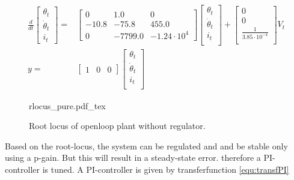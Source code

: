 \documentclass[../../../Main]{subfiles}
\begin{document}
\begin{equation}
      \label{eq:zero_linearized}
      \begin{split}
      \frac{d}{dt}
    \begin{bmatrix}
        \theta_t \\
        \dot \theta_t \\
        i_t
    \end{bmatrix}
    =&
    \begin{bmatrix}0 & 1.0 & 0\\ -10.8 & -75.8 & 455.0\\ 0 & -7799.0 & -1.24\cdot10^{4}\end{bmatrix}
    \begin{bmatrix}
        \theta_t \\
        \dot \theta_t \\
        i_t \\
    \end{bmatrix}
    +
    \begin{bmatrix}
        0 \\
        0 \\
	\frac{1}{3.85\cdot10^{-4}}\\
    \end{bmatrix}
    V_t
\\
      y =&
    \begin{bmatrix}
        1 & 0 & 0
    \end{bmatrix}
    \begin{bmatrix}
        \theta_t \\
        \dot \theta_t\\
        i_t\\
    \end{bmatrix}
    \end{split}
\end{equation}

\begin{figure}[H]
\centering
\def\svgwidth{\textwidth}
{rlocus_pure.pdf_tex}
\caption{Root locus of openloop plant without regulator.}
\label{fig:rlocus_pure}
\end{figure}

Based on the root-locus, the system can be regulated and and be stable only using a p-gain. 
But this will result in a steady-state error. therefore a PI-controller is tuned. 
A PI-controller is given by transferfunction \ref{equ:transfPI}
\end{document}
